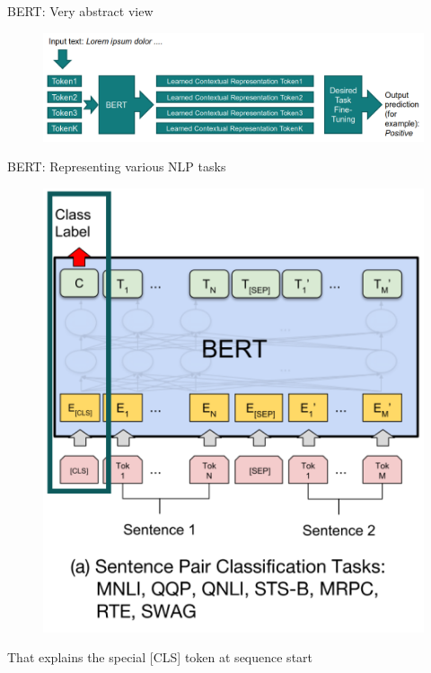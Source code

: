 \documentclass[12pt,aspectratio=169,handout]{beamer}
\begin{document}
\begin{frame}{BERT: Very abstract view}
	
	\begin{figure}
		\includegraphics[width=\linewidth]{img/bert1.png}
	\end{figure}	
	
\end{frame}


\begin{frame}{BERT: Representing various NLP tasks}
	
	\begin{figure}
		\includegraphics[width=0.5\linewidth]{img/task1.png}
	\end{figure}
	
	That explains the special [CLS] token at sequence start
	
\end{frame}
\end{document}
